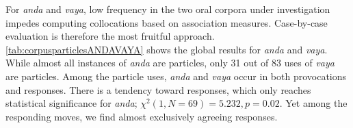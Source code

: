 
%		
%		


For \textit{anda} and \textit{vaya}, low frequency in the two oral corpora under investigation impedes computing collocations based on association measures. Case-by-case evaluation is therefore the most fruitful approach. \autoref{tab:corpusparticlesANDAVAYA} shows the global results for \textit{anda} and \textit{vaya}. While almost all instances of \textit{anda} are particles, only 31 out of 83 uses of \textit{vaya} are particles. Among the particle uses, \textit{anda} and \textit{vaya} occur in both provocations and responses. There is a tendency toward responses, which only reaches statistical significance for \textit{anda}; $\chi^2(1, N = 69) = 5.232,\allowbreak p= 0.02$. Yet among the responding moves, we find almost exclusively agreeing responses.

